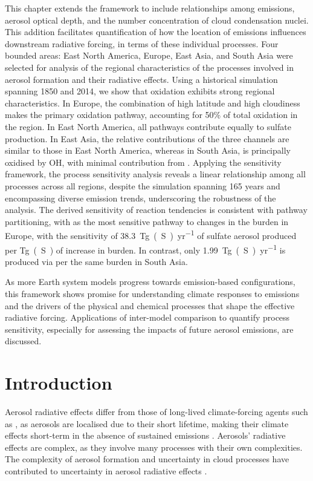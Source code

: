 This chapter extends the framework to include relationships among  emissions, aerosol optical depth, and the number concentration of cloud condensation nuclei. This addition facilitates quantification of how the location of emissions influences downstream radiative forcing, in terms of these individual processes. Four bounded areas: East North America, Europe, East Asia, and South Asia were selected for analysis of the regional characteristics of the processes involved in aerosol formation and their radiative effects. Using a historical simulation spanning 1850 and 2014, we show that  oxidation exhibits strong regional characteristics. In Europe, the combination of high latitude and high cloudiness makes  the primary oxidation pathway, accounting for 50\% of total oxidation in the region. In East North America, all pathways contribute equally to sulfate production. In East Asia, the relative contributions of the three channels are similar to those in East North America, whereas in South Asia,  is principally oxidised by OH, with minimal contribution from . Applying the sensitivity framework, the process sensitivity analysis reveals a linear relationship among all processes across all regions, despite the simulation spanning 165 years and encompassing diverse emission trends, underscoring the robustness of the analysis. The derived sensitivity of reaction tendencies is consistent with pathway partitioning, with  as the most sensitive pathway to changes in the  burden in Europe, with the sensitivity of \qty{38.3}{Tg(S)~yr^{-1}} of sulfate aerosol produced per \unit{Tg(S)} of increase in  burden. In contrast, only \qty{1.99}{Tg(S)~yr^{-1}} is produced via  per the same burden in South Asia. 

As more Earth system models progress towards emission-based configurations, this framework shows promise for understanding climate responses to emissions and the drivers of the physical and chemical processes that shape the effective radiative forcing. Applications of inter-model comparison to quantify process sensitivity, especially for assessing the impacts of future aerosol emissions, are discussed.

\section{Introduction}

Aerosol radiative effects differ from those of long-lived climate-forcing agents such as , as aerosols are localised due to their short lifetime, making their climate effects short-term in the absence of sustained emissions \citep[e.g.][]{forsterEarthEnergyBudget2021, szopaShortlivedClimateForcers2021}. Aerosols' radiative effects are complex, as they involve many processes with their own complexities. The complexity of aerosol formation and uncertainty in cloud processes have contributed to uncertainty in aerosol radiative effects \citep[e.g.,][]{bellouinBoundingGlobalAerosol2020}. 


